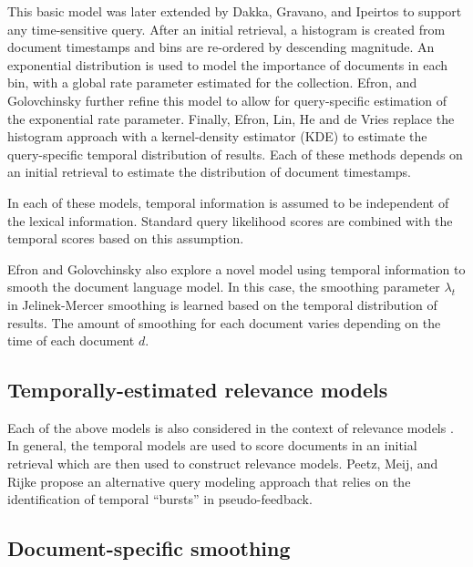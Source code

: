 \documentclass{sig-alternate}
\begin{document}
This basic model was later extended by  Dakka, Gravano, and Ipeirtos \cite{Dakka2012} to support any time-sensitive query. After an initial retrieval, a histogram is created from document timestamps and bins are re-ordered by descending magnitude. An exponential distribution is used to model the importance of documents in each bin, with a global rate parameter estimated for the collection.  Efron, and Golovchinsky \cite{Efron2011} further refine this model to allow for query-specific estimation of the exponential rate parameter.  Finally, Efron, Lin, He and de Vries \cite{Efron2014} replace the histogram approach with a kernel-density estimator (KDE) to estimate the query-specific temporal distribution of results.  Each of these methods depends on an initial retrieval to estimate the distribution of document timestamps.

In each of these models, temporal information is assumed to be independent of the lexical information. Standard query likelihood scores are combined with the temporal scores based on this assumption.

Efron and Golovchinsky \cite{Efron2011} also explore a novel model using temporal information to smooth the document language model. In this case, the smoothing parameter $\lambda_t$ in Jelinek-Mercer smoothing is learned based on the temporal distribution of results. The amount of smoothing for each document varies depending on the time of each document $d$.

\subsection{Temporally-estimated relevance models}

Each of the above models is also considered in the context of relevance models \cite{Lavrenko2001}. In general, the temporal models are used to score documents in an initial retrieval which are then used to construct relevance models.  Peetz, Meij, and Rijke \cite{Peetz2013a} propose an alternative query modeling approach that relies on the identification of temporal ``bursts'' in pseudo-feedback. 

\subsection{Document-specific smoothing}
\end{document}
